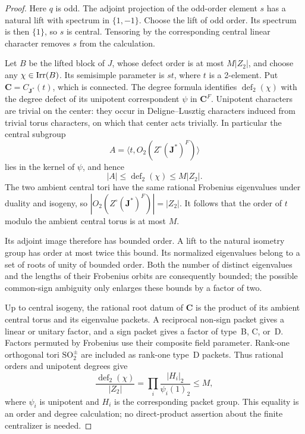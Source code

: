 \begin{proof}
Here \(q\) is odd.  The adjoint projection of the odd-order element
\(s\) has a natural lift with spectrum in \(\{1,-1\}\).  Choose
the lift of odd order.  Its spectrum is then \(\{1\}\), so \(s\)
is central.  Tensoring by the corresponding central linear
character removes \(s\) from the calculation.

Let \(B\) be the lifted block of \(J\), whose defect order is at
most \(M|Z_2|\), and choose any \(\chi\in\operatorname{Irr}(B)\).  Its
semisimple parameter is \(st\), where \(t\) is a 2-element.
Put \(\mathbf C=C_{\mathbf J^*}(t)\), which is connected.
The degree formula identifies \(\operatorname{def}_2(\chi)\)
with the degree defect of its unipotent correspondent \(\psi\)
in \(\mathbf C^F\).  Unipotent characters are trivial on the
center: they occur in Deligne--Lusztig characters induced from
trivial torus characters, on which that center acts trivially.
In particular the central subgroup
\[
 A=\langle t,O_2(Z^\circ(\mathbf J^*)^F)\rangle
\]
lies in the kernel of \(\psi\), and hence
\[
 |A|\leq\operatorname{def}_2(\chi)\leq M|Z_2|.
\]
The two ambient central tori have the same rational Frobenius
eigenvalues under duality and isogeny, so
\(|O_2(Z^\circ(\mathbf J^*)^F)|=|Z_2|\).
It follows that the order of \(t\) modulo the ambient central
torus is at most \(M\).

Its adjoint image therefore has bounded order.  A lift to the
natural isometry group has order at most twice this bound.  Its
normalized eigenvalues belong to a set of roots of unity of
bounded order.  Both the number of distinct eigenvalues and
the lengths of their Frobenius orbits are consequently bounded;
the possible common-sign ambiguity only enlarges these bounds
by a factor of two.

Up to central isogeny, the rational root datum of \(\mathbf C\)
is the product of its ambient central torus and its eigenvalue
packets.  A reciprocal non-sign packet gives a linear or unitary
factor, and a sign packet gives a factor of type~B, C, or~D.  Factors permuted
by Frobenius use their composite field parameter.  Rank-one
orthogonal tori \(\mathrm{SO}_2^\pm\) are included as rank-one
type~D packets.  Thus rational orders and unipotent degrees give
\begin{equation}\label{fam:two-product}
 \frac{\operatorname{def}_2(\chi)}{|Z_2|}
   =\prod_i\frac{|H_i|_2}{\psi_i(1)_2}\leq M,
\end{equation}
where \(\psi_i\) is unipotent and \(H_i\) is the corresponding
packet group.  This equality is an order and degree calculation;
no direct-product assertion about the finite centralizer is needed.


\end{proof}
